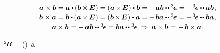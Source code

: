 \nopagebreak
\begin{equation}\label{crossproductoftwovectors}
\begin{array}{c}
\bm{a} \times \bm{b}
= \bm{a} \dotp \hspace{-0.1ex}
\left(
   \bm{b}
   \hspace{-0.1ex} \times \hspace{-0.25ex}
   \UnitDyad
   \hspace{.1ex} \right)
= \left( \bm{a} \hspace{-0.1ex} \times \hspace{-0.25ex} \UnitDyad \hspace{.1ex} \right) \hspace{-0.1ex} \dotp \bm{b}
= - \hspace{.25ex} \bm{a} \bm{b} \dotdotp \levicivitatensor
= - \hspace{.2ex} \levicivitatensor \dotdotp \bm{a} \bm{b}
\hspace{.15ex} ,
\\[.15em]
%
\bm{b} \times \bm{a}
= \bm{b} \dotp \hspace{-0.1ex} \left( \bm{a} \hspace{-0.1ex} \times \hspace{-0.25ex} \UnitDyad \hspace{.1ex} \right)
= \left( \bm{b} \hspace{-0.1ex} \times \hspace{-0.25ex} \UnitDyad \hspace{.1ex} \right)  \hspace{-0.1ex} \dotp \bm{a}
= - \hspace{.25ex} \bm{b} \bm{a} \dotdotp \levicivitatensor
= - \hspace{.2ex} \levicivitatensor \dotdotp \bm{b} \bm{a}
\hspace{.15ex} ,
\\[.2em]
%
\bm{a} \times \bm{b} \hspace{.16ex}
= - \hspace{.33ex} \bm{a} \bm{b} \dotdotp \levicivitatensor
= \bm{b} \bm{a} \dotdotp \levicivitatensor
\:\Rightarrow\:
\bm{a} \times \bm{b} \hspace{.16ex} = - \hspace{.32ex} \bm{b} \times \bm{a}
\hspace{.2ex} .
\end{array}
\end{equation}

\vspace{-0.2em} \noindent
{}  ~${\hspace{-0.2ex}^2\hspace{-0.16em}\bm{B}}$
~~()~$\bm{a}$

